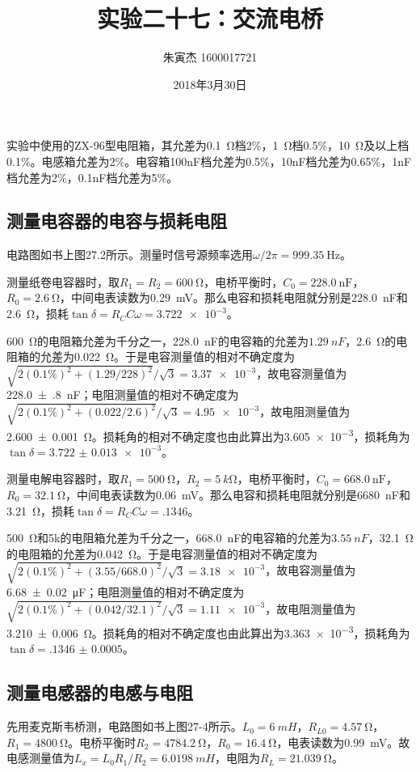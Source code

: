 \documentclass[UTF8]{ctexart}
\title{实验二十七：交流电桥}
\author{朱寅杰 1600017721}
\date{2018年3月30日}
\begin{document}
\maketitle
\setcounter{section}{27}
实验中使用的ZX-96型电阻箱，其允差为\SI{.1}{\ohm}档2\%，\SI{1}{\ohm}档0.5\%，\SI{10}{\ohm}及以上档0.1\%。电感箱允差为2\%。电容箱100nF档允差为0.5\%，10nF档允差为0.65\%，1nF档允差为2\%，0.1nF档允差为5\%。
\subsection{测量电容器的电容与损耗电阻}
电路图如书上图27.2所示。测量时信号源频率选用$\omega/2\pi=\SI{999.35}{\Hz}$。

测量纸卷电容器时，取$R_1=R_2=\SI{600}{\ohm}$，电桥平衡时，$C_0=\SI{228.0}{\nano\F}$，$R_0=\SI{2.6}{\ohm}$，中间电表读数为\SI{.29}{mV}。那么电容和损耗电阻就分别是\SI{228.0}{nF}和\SI{2.6}{\ohm}，损耗$\tan\delta=R_CC\omega=\num{3.722e-3}$。

\SI{600}{\ohm}的电阻箱允差为千分之一，\SI{228.0}{nF}的电容箱的允差为$\SI{1.29}{nF}$，\SI{2.6}{\ohm}的电阻箱的允差为\SI{.022}{\ohm}。于是电容测量值的相对不确定度为$\sqrt{2(0.1\%)^2+(1.29/228)^2}/\sqrt{3}=\num{3.37e-3}$，故电容测量值为\SI{228.0(8)}{nF}；电阻测量值的相对不确定度为$\sqrt{2(0.1\%)^2+(0.022/2.6)^2}/\sqrt{3}=\num{4.95e-3}$，故电阻测量值为\SI{2.600(1)}{\ohm}。损耗角的相对不确定度也由此算出为\num{3.605e-3}，损耗角为$\tan\delta=\num{3.722(13)e-3}$。

测量电解电容器时，取$R_1=\SI{500}{\ohm}$，$R_2=\SI{5}{k\ohm}$，电桥平衡时，$C_0=\SI{668.0}{\nano\F}$，$R_0=\SI{32.1}{\ohm}$，中间电表读数为\SI{.06}{mV}。那么电容和损耗电阻就分别是\SI{6680}{nF}和\SI{3.21}{\ohm}，损耗$\tan\delta=R_CC\omega=\num{.1346}$。

\SI{500}{\ohm}和5k的电阻箱允差为千分之一，\SI{668.0}{nF}的电容箱的允差为$\SI{3.55}{nF}$，\SI{32.1}{\ohm}的电阻箱的允差为\SI{.042}{\ohm}。于是电容测量值的相对不确定度为$\sqrt{2(0.1\%)^2+(3.55/668.0)^2}/\sqrt{3}=\num{3.18e-3}$，故电容测量值为\SI{6.68(2)}{\micro\F}；电阻测量值的相对不确定度为$\sqrt{2(0.1\%)^2+(0.042/32.1)^2}/\sqrt{3}=\num{1.11e-3}$，故电阻测量值为\SI{3.210(6)}{\ohm}。损耗角的相对不确定度也由此算出为\num{3.363e-3}，损耗角为$\tan\delta=\num{.1346(5)}$。
\subsection{测量电感器的电感与电阻}
先用麦克斯韦桥测，电路图如书上图27-4所示。$L_0=\SI{6}{mH}$，$R_{L0}=\SI{4.57}{\ohm}$，$R_1=\SI{4800}{\ohm}$。电桥平衡时$R_2=\SI{4784.2}{\ohm}$，$R_0=\SI{16.4}{\ohm}$，电表读数为\SI{.99}{mV}。故电感测量值为$L_x=L_0R_1/R_2=\SI{6.0198}{mH}$，电阻为$R_L=\SI{21.039}{\ohm}$。
\end{document}
